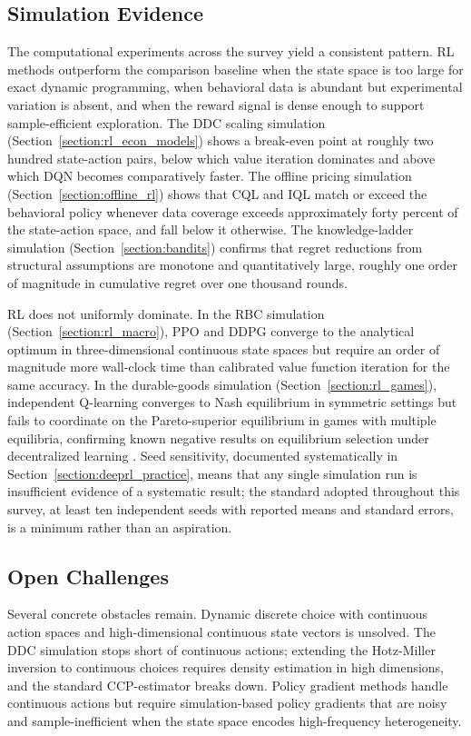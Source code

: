 \subsection{Simulation Evidence}

The computational experiments across the survey yield a consistent pattern.
RL methods outperform the comparison baseline when the state space is too large for exact dynamic programming, when behavioral data is abundant but experimental variation is absent, and when the reward signal is dense enough to support sample-efficient exploration.
The DDC scaling simulation (Section~\ref{section:rl_econ_models}) shows a break-even point at roughly two hundred state-action pairs, below which value iteration dominates and above which DQN becomes comparatively faster.
The offline pricing simulation (Section~\ref{section:offline_rl}) shows that CQL and IQL match or exceed the behavioral policy whenever data coverage exceeds approximately forty percent of the state-action space, and fall below it otherwise.
The knowledge-ladder simulation (Section~\ref{section:bandits}) confirms that regret reductions from structural assumptions are monotone and quantitatively large, roughly one order of magnitude in cumulative regret over one thousand rounds.

RL does not uniformly dominate.
In the RBC simulation (Section~\ref{section:rl_macro}), PPO and DDPG converge to the analytical optimum in three-dimensional continuous state spaces but require an order of magnitude more wall-clock time than calibrated value function iteration for the same accuracy.
In the durable-goods simulation (Section~\ref{section:rl_games}), independent Q-learning converges to Nash equilibrium in symmetric settings but fails to coordinate on the Pareto-superior equilibrium in games with multiple equilibria, confirming known negative results on equilibrium selection under decentralized learning \citep{FudenbergKreps1993}.
Seed sensitivity, documented systematically in Section~\ref{section:deeprl_practice}, means that any single simulation run is insufficient evidence of a systematic result; the standard adopted throughout this survey, at least ten independent seeds with reported means and standard errors, is a minimum rather than an aspiration.

\subsection{Open Challenges}

Several concrete obstacles remain.
Dynamic discrete choice with continuous action spaces and high-dimensional continuous state vectors is unsolved.
The DDC simulation stops short of continuous actions; extending the Hotz-Miller inversion \citep{HotzMiller1993} to continuous choices requires density estimation in high dimensions, and the standard CCP-estimator breaks down.
Policy gradient methods handle continuous actions but require simulation-based policy gradients that are noisy and sample-inefficient when the state space encodes high-frequency heterogeneity.

